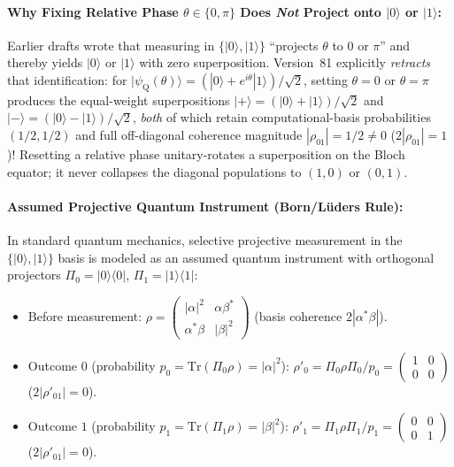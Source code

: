 \paragraph{Why Fixing Relative Phase $\theta \in \{0, \pi\}$ Does \emph{Not} Project onto $|0\rangle$ or $|1\rangle$:}
Earlier drafts wrote that measuring in $\{|0\rangle, |1\rangle\}$ ``projects $\theta$ to $0$ or $\pi$'' and thereby yields $|0\rangle$ or $|1\rangle$ with zero superposition. Version~81 explicitly \emph{retracts} that identification: for $|\psi_{\mathrm{Q}}(\theta)\rangle = (|0\rangle + e^{i\theta}|1\rangle)/\sqrt{2}$, setting $\theta = 0$ or $\theta = \pi$ produces the equal-weight superpositions $|+\rangle = (|0\rangle + |1\rangle)/\sqrt{2}$ and $|-\rangle = (|0\rangle - |1\rangle)/\sqrt{2}$, \emph{both} of which retain computational-basis probabilities $(1/2, 1/2)$ and full off-diagonal coherence magnitude $|\rho_{01}| = 1/2 \ne 0$ ($2|\rho_{01}| = 1$)! Resetting a relative phase unitary-rotates a superposition on the Bloch equator; it never collapses the diagonal populations to $(1, 0)$ or $(0, 1)$.

\paragraph{Assumed Projective Quantum Instrument (Born/L\"uders Rule):}
In standard quantum mechanics, selective projective measurement in the $\{|0\rangle, |1\rangle\}$ basis is modeled as an assumed quantum instrument with orthogonal projectors $\Pi_0 = |0\rangle\langle 0|$, $\Pi_1 = |1\rangle\langle 1|$:
\begin{itemize}[leftmargin=2em]
  \item Before measurement: $\rho = \begin{pmatrix} |\alpha|^2 & \alpha\beta^* \\ \alpha^*\beta & |\beta|^2 \end{pmatrix}$ (basis coherence $2|\alpha^*\beta|$).
  \item Outcome $0$ (probability $p_0 = \mathrm{Tr}(\Pi_0\rho) = |\alpha|^2$): $\rho'_0 = \Pi_0\rho\Pi_0 / p_0 = \begin{pmatrix} 1 & 0 \\ 0 & 0 \end{pmatrix}$ ($2|\rho'_{01}| = 0$).
  \item Outcome $1$ (probability $p_1 = \mathrm{Tr}(\Pi_1\rho) = |\beta|^2$): $\rho'_1 = \Pi_1\rho\Pi_1 / p_1 = \begin{pmatrix} 0 & 0 \\ 0 & 1 \end{pmatrix}$ ($2|\rho'_{01}| = 0$).
\end{itemize}

